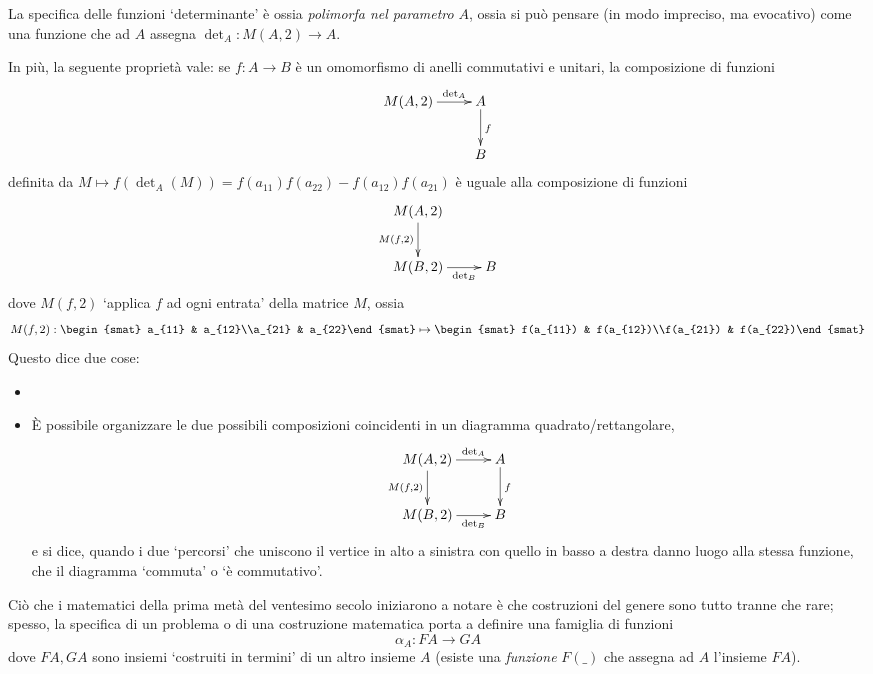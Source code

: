 La specifica delle funzioni `determinante' è ossia \emph{polimorfa nel parametro} \(A\), ossia si può pensare (in modo impreciso, ma evocativo) come una funzione che ad \(A\) assegna  \(\det_A : M(A,2) \to A\).

In più, la seguente proprietà vale: se \(f : A\to B\) è un omomorfismo di anelli commutativi e unitari, la composizione di funzioni
\[\xymatrix{
	M(A,2) \ar[r]^-{\det_A}& A\ar[d]^f \\
	& B
	}\]
definita da \(M\mapsto f(\det_A(M)) = f(a_{11})f(a_{22})-f(a_{12})f(a_{21})\) è uguale alla composizione di funzioni
\[\xymatrix{
	M(A,2) \ar[d]_{M(f,2)}&  \\
	M(B,2) \ar[r]_-{\det_B} & B
	}\] dove \(M(f,2)\) `applica \(f\) ad ogni entrata' della matrice \(M\), ossia
\[M(f,2) : \begin{smat} a_{11} & a_{12}\\a_{21} & a_{22}\end{smat} \mapsto \begin{smat} f(a_{11}) & f(a_{12})\\f(a_{21}) & f(a_{22})\end{smat}\]
Questo dice due cose:
\begin{itemize}
	\item {}
	\item \`E possibile organizzare le due possibili composizioni coincidenti in un diagramma quadrato/rettangolare,
	      \[\xymatrix{
		      M(A,2) \ar[d]_{M(f,2)}\ar[r]^-{\det_A}& A\ar[d]^f \\
		      M(B,2) \ar[r]_-{\det_B} & B
		      }\]
	      e si dice, quando i due `percorsi' che uniscono il vertice in alto a sinistra con quello in basso a destra danno luogo alla stessa funzione, che il diagramma `commuta' o `è commutativo'.
\end{itemize}
Ciò che i matematici della prima metà del ventesimo secolo iniziarono a notare è che costruzioni del genere sono tutto tranne che rare; spesso, la specifica di un problema o di una costruzione matematica porta a definire una famiglia di funzioni
\[\alpha_A : FA \to GA \]
dove \(FA,GA\) sono insiemi `costruiti in termini' di un altro insieme \(A\) (esiste una \emph{funzione} \(F(\_)\) che assegna ad \(A\) l'insieme \(FA\)).

